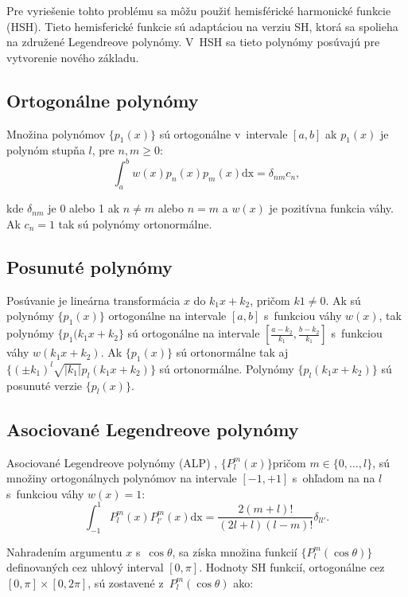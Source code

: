 Pre vyriešenie tohto problému sa môžu použiť hemisférické harmonické funkcie (HSH). Tieto hemisferické funkcie sú adaptáciou na verziu SH, ktorá sa spolieha na združené Legendreove polynómy. V~HSH sa tieto polynómy posúvajú pre vytvorenie nového základu.

\subsection*{Ortogonálne polynómy}
Množina polynómov $\{p_1(x)\}$ sú ortogonálne \cite{HSH} v~intervale $[a,b]$ ak $p_1(x)$ je polynóm stupňa $l$, pre $n,m \geq 0$:
\begin{equation} \label{OP}
    \int^b_a w(x)p_n(x)p_m(x) \text{dx} = \delta_{nm}c_n,
\end{equation}

\noindent kde $\delta_{nm}$ je 0 alebo 1 ak $n \neq m$ alebo $n = m$ a $w(x)$ je pozitívna funkcia váhy. Ak $c_n = 1$ tak sú polynómy ortonormálne.

\subsection*{Posunuté polynómy}
Posúvanie je lineárna transformácia \cite{HSH} $x$ do $k_1x + k_2$, pričom $k1 \neq 0$. Ak sú polynómy $\{p_1(x)\}$ ortogonálne na intervale $[a,b]$ s~funkciou váhy $w(x)$, tak polynómy $\{p_1(k_1x+k_2\}$ sú ortogonálne na intervale $[\frac{a-k_2}{k_1}, \frac{b-k_2}{k_1}]$ s~funkciou váhy $w(k_1x + k_2)$. Ak $\{p_1(x)\}$ sú ortonormálne tak aj $\{(\pm k_1)^l \sqrt{| k_1 |}p_l(k_1x + k_2)\}$ sú ortonormálne. Polynómy $\{p_l(k_1x+k_2)\}$ sú posunuté verzie $\{p_l(x)\}$.

\subsection*{Asociované Legendreove polynómy}
Asociované Legendreove polynómy (ALP) \cite{HSH}, $\{P_l^m(x)\} \text{pričom } m \in \{0,\dots,l\}$, sú množiny ortogonálnych polynómov na intervale $[-1, +1]$ s~ohľadom na na $l$ s~funkciou váhy $w(x) = 1$:
\begin{equation} \label{ZLP}
    \int^1_{-1} P_l^m(x) P_{l'}^{m}(x) \text{dx} = \frac{2(m + l)!}{(2l + l)(l-m)!}\delta_{ll'}.
\end{equation}

Nahradením argumentu $x$ s~$\cos \theta$, sa získa množina funkcií $\{P_l^m(\cos\theta)\}$ definovaných cez uhlový interval $[0, \pi]$. Hodnoty SH funkcií, ortogonálne cez $[0,\pi] \times [0, 2\pi]$, sú zostavené z~$P^m_l(\cos\theta)$ ako:

